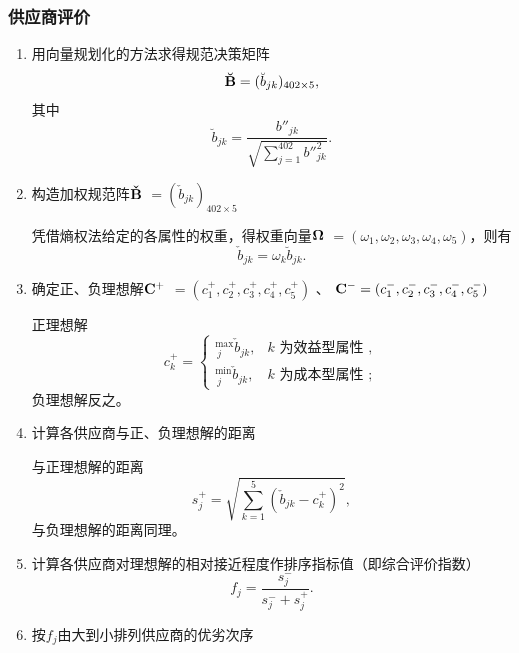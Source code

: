 \subsubsection{供应商评价}

\begin{enumerate}

\item 用向量规划化的方法求得规范决策矩阵
\begin{equation}
 {\bf \breve{B}} =(\breve{b}_{jk})_{402 \times 5},
\end{equation}
其中
\begin{equation}
    \breve{b}_{jk}=\frac{b''_{jk}}{\sqrt{\sum_{j=1}^{402}b''_{jk}^2}}.
\end{equation}
\item 构造加权规范阵$ \bf \check{B} $ $=(\check{b}_{jk})_{402 \times 5}$

凭借熵权法给定的各属性的权重，得权重向量$ \bf \Omega $ $ =(\omega_1,\omega_2,\omega_3,\omega_4,\omega_5)$，则有
\begin{equation}
    \check{b}_{jk}=\omega_k\breve{b}_{jk}.
\end{equation}
\item 确定正、负理想解$ \bf C^+$ $=(c_1^+,c_2^+,c_3^+,c_4^+,c_5^+)$
、
${\bf C^{-}}=(c_1^-,c_2^-,c_3^-,c_4^-,c_5^-)$

正理想解
\begin{equation}
c_{k}^{+}=\left\{\begin{array}{ll}
{ }_{\ j}^{\max } \check{b}_{jk}, & k \text { 为效益型属性 }, \\
{ }_{\ j}^{\min } \check{b}_{jk}, & k \text { 为成本型属性 };
\end{array}\right.
\end{equation}
负理想解反之。

\item 计算各供应商与正、负理想解的距离

与正理想解的距离
\begin{equation}
    s_j^+=\sqrt{\sum_{k=1}^5(\check{b}_{jk}-c_k^+)^2} ,
\end{equation}
与负理想解的距离同理。
\item 计算各供应商对理想解的相对接近程度作排序指标值（即综合评价指数）
\begin{equation}
    f_j=\frac{s_j^-}{s_j^-+s_j^+}.
\end{equation}
\item 按$f_j$由大到小排列供应商的优劣次序

\end{enumerate}

